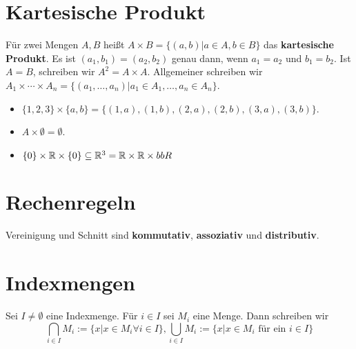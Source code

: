 \section{Kartesische Produkt}
 {
	Für zwei Mengen $A, B$ heißt $A \times B = \{(a, b) \vert a \in A, b \in B\}$ das \textbf{kartesische Produkt}. Es ist $(a_1, b_1) = (a_2, b_2)$ genau dann, wenn $a_1 = a_2$ und $b_1 = b_2$. Ist $A = B$, schreiben wir $A^2 = A \times A$. Allgemeiner schreiben wir $A_1 \times \cdots \times A_n = \{(a_1, \dots, a_n) \vert a_1 \in A_1, \dots, a_n \in A_n\}.$
}
 {
	\begin{itemize}
		\item $\{1, 2, 3\} \times \{a, b\}  = \{(1, a), (1, b), (2, a), (2, b), (3, a), (3, b)\}.$
		\item $A \times \emptyset = \emptyset$.
		\item $\{0\} \times \mathbb{R} \times \{0\} \subseteq \mathbb{R}^3 = \mathbb{R} \times \mathbb{R} \times bbR$
	\end{itemize}
}
\section{Rechenregeln}
Vereinigung und Schnitt sind \textbf{kommutativ}, \textbf{assoziativ} und \textbf{distributiv}.

\section{Indexmengen}
 {
	Sei $I \neq \emptyset$ eine Indexmenge. Für $i \in I$ sei $M_i$ eine Menge. Dann schreiben wir
	$$
	\bigcap\limits_{i \in I}M_i := \{x \vert x \in M_i \forall i \in I\}, \bigcup\limits_{i \in I}M_i := \{x \vert x \in M_i \text{ für ein } i \in I\}
	$$
}

